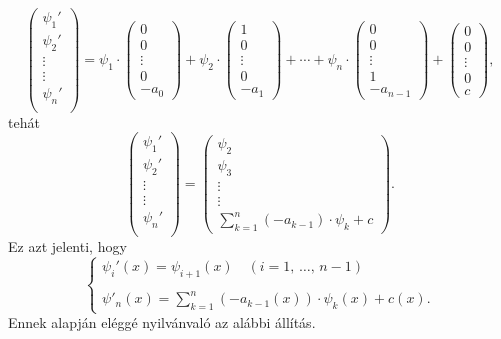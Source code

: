 \[
	\begin{pmatrix}
		\psi_1' \\
		\psi_2' \\
		\vdots \\
		\vdots \\
		\psi_n' \\
	\end{pmatrix} =
	\psi_1 \cdot \begin{pmatrix}
		0 \\
		0 \\
		\vdots \\
		0 \\
		-a_0
	\end{pmatrix} + 
	\psi_2 \cdot \begin{pmatrix}
		1 \\
		0 \\
		\vdots \\
		0 \\
		-a_1
	\end{pmatrix} + \cdots + 
	\psi_n \cdot \begin{pmatrix}
		0 \\
		0 \\
		\vdots \\
		1 \\
		-a_{n-1}
	\end{pmatrix} +
	\begin{pmatrix}
		0 \\
		0 \\
		\vdots \\
		0 \\
		c
	\end{pmatrix},
\]
tehát
\[
	\begin{pmatrix}
		\psi_1' \\
		\psi_2' \\
		\vdots \\
		\vdots \\
		\psi_n' \\
	\end{pmatrix} =
	\begin{pmatrix}
		\psi_2 \\
		\psi_3 \\
		\vdots \\
		\vdots \\
		\sum_{k=1}^n (-a_{k-1}) \cdot \psi_k + c
	\end{pmatrix}.
\]
Ez azt jelenti, hogy
\begin{equation}
	\begin{cases}
		\psi_i'(x) = \psi_{i+1}(x) \quad (i = 1, \, \dots, \, n-1)\\
		\\
		\displaystyle \psi'_n(x) = \sum_{k=1}^n (-a_{k-1}(x)) \cdot \psi_k(x) + c(x).
	\end{cases}
	\tag{$\star$}
\end{equation}
Ennek alapján eléggé nyilvánvaló az alábbi állítás.\\

